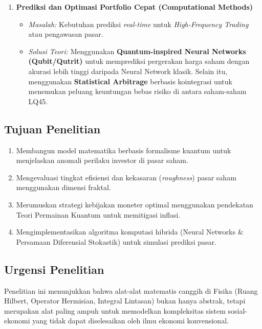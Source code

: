 \begin{enumerate}
    \item \textbf{Prediksi dan Optimasi Portfolio Cepat (Computational Methods)}
    \begin{itemize}
        \item \textit{Masalah:} Kebutuhan prediksi \textit{real-time} untuk \textit{High-Frequency Trading} atau pengawasan pasar.
        \item \textit{Solusi Teori:} Menggunakan \textbf{Quantum-inspired Neural Networks (Qubit/Qutrit)} untuk memprediksi pergerakan harga saham dengan akurasi lebih tinggi daripada Neural Network klasik. Selain itu, menggunakan \textbf{Statistical Arbitrage} berbasis kointegrasi untuk menemukan peluang keuntungan bebas risiko di antara saham-saham LQ45.
    \end{itemize}
\end{enumerate}

\subsection{Tujuan Penelitian}

\begin{enumerate}
    \item Membangun model matematika berbasis formalisme kuantum untuk menjelaskan anomali perilaku investor di pasar saham.
    \item Mengevaluasi tingkat efisiensi dan kekasaran (\textit{roughness}) pasar saham menggunakan dimensi fraktal.
    \item Merumuskan strategi kebijakan moneter optimal menggunakan pendekatan Teori Permainan Kuantum untuk memitigasi inflasi.
    \item Mengimplementasikan algoritma komputasi hibrida (Neural Networks \& Persamaan Diferensial Stokastik) untuk simulasi prediksi pasar.
\end{enumerate}

\subsection{Urgensi Penelitian}
Penelitian ini menunjukkan bahwa alat-alat matematis canggih di Fisika (Ruang Hilbert, Operator Hermisian, Integral Lintasan) bukan hanya abstrak, tetapi merupakan alat paling ampuh untuk memodelkan kompleksitas sistem sosial-ekonomi yang tidak dapat diselesaikan oleh ilmu ekonomi konvensional.